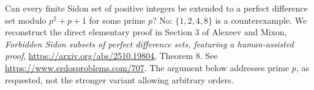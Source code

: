Can every finite Sidon set of positive integers be extended to a
perfect difference set modulo \(p^2+p+1\) for some prime \(p\)?
No: \(\{1,2,4,8\}\) is a counterexample.
We reconstruct the direct elementary proof in Section 3 of
Alexeev and Mixon, \emph{Forbidden Sidon subsets of perfect
difference sets, featuring a human-assisted proof},
\url{https://arxiv.org/abs/2510.19804}, Theorem 8.
See \url{https://www.erdosproblems.com/707}.
The argument below addresses prime \(p\), as requested, not the
stronger variant allowing arbitrary orders.
